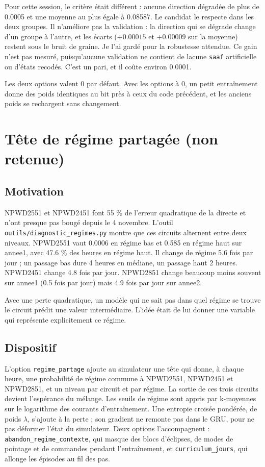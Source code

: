 \documentclass[11pt,a4paper]{article}
\newcommand{\code}[1]{\texttt{#1}}
\begin{document}
Pour cette session, le critère était différent : aucune direction dégradée de plus de 0.0005 et une moyenne au plus égale à 0.08587. Le candidat le respecte dans les deux groupes. Il n'améliore pas la validation : la direction qui se dégrade change d'un groupe à l'autre, et les écarts ($+0.00015$ et $+0.00009$ sur la moyenne) restent sous le bruit de graine. Je l'ai gardé pour la robustesse attendue. Ce gain n'est pas mesuré, puisqu'aucune validation ne contient de lacune \code{saaf} artificielle ou d'états recodés. C'est un pari, et il coûte environ 0.0001.

Les deux options valent 0 par défaut. Avec les options à 0, un petit entraînement donne des poids identiques au bit près à ceux du code précédent, et les anciens poids se rechargent sans changement.

\section{Tête de régime partagée (non retenue)}

\subsection{Motivation}

NPWD2551 et NPWD2451 font 55 \% de l'erreur quadratique de la directe et n'ont presque pas bougé depuis le 4 novembre. L'outil \code{outils/diagnostic\_regimes.py} montre que ces circuits alternent entre deux niveaux. NPWD2551 vaut 0.0006 en régime bas et 0.585 en régime haut sur annee1, avec 47.6 \% des heures en régime haut. Il change de régime 5.6 fois par jour ; un passage bas dure 4 heures en médiane, un passage haut 2 heures. NPWD2451 change 4.8 fois par jour. NPWD2851 change beaucoup moins souvent sur annee1 (0.5 fois par jour) mais 4.9 fois par jour sur annee2.

Avec une perte quadratique, un modèle qui ne sait pas dans quel régime se trouve le circuit prédit une valeur intermédiaire. L'idée était de lui donner une variable qui représente explicitement ce régime.

\subsection{Dispositif}

L'option \code{regime\_partage} ajoute au simulateur une tête qui donne, à chaque heure, une probabilité de régime commune à NPWD2551, NPWD2451 et NPWD2851, et un niveau par circuit et par régime. La sortie de ces trois circuits devient l'espérance du mélange. Les seuils de régime sont appris par k-moyennes sur le logarithme des courants d'entraînement. Une entropie croisée pondérée, de poids $\lambda$, s'ajoute à la perte ; son gradient ne remonte pas dans le GRU, pour ne pas déformer l'état du simulateur. Deux options l'accompagnent : \code{abandon\_regime\_contexte}, qui masque des blocs d'éclipses, de modes de pointage et de commandes pendant l'entraînement, et \code{curriculum\_jours}, qui allonge les épisodes au fil des pas.
\end{document}
